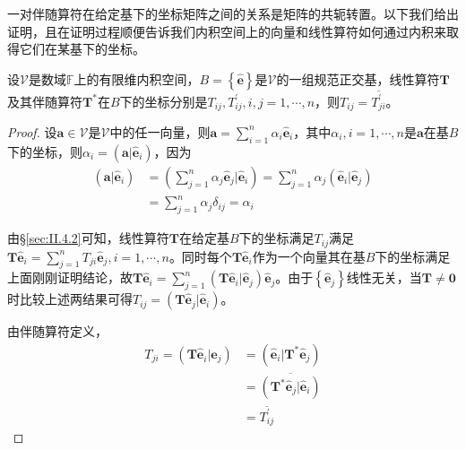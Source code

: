 \documentclass[main.tex]{subfiles}
\begin{document}
一对伴随算符在给定基下的坐标矩阵之间的关系是矩阵的共轭转置。以下我们给出证明，且在证明过程顺便告诉我们内积空间上的向量和线性算符如何通过内积来取得它们在某基下的坐标。

\begin{theorem}
设$\mathcal{V}$是数域$\mathbb{F}$上的有限维内积空间，$B=\left\{\mathbf{\hat{e}}\right\}$是$\mathcal{V}$的一组规范正交基，线性算符$\mathbf{T}$及其伴随算符$\mathbf{T}^*$在$B$下的坐标分别是$T_{ij},T^\prime_{ij},i,j=1,\cdots,n$，则$T_{ij}=\overline{T^\prime_{ji}}$。
\end{theorem}
\begin{proof}
设$\mathbf{a}\in\mathcal{V}$是$\mathcal{V}$中的任一向量，则$\mathbf{a}=\sum_{i=1}^n\alpha_i\mathbf{\hat{e}}_i$，其中$\alpha_i,i=1,\cdots,n$是$\mathbf{a}$在基$B$下的坐标，则$\alpha_i=\left(\mathbf{a}|\mathbf{\hat{e}}_i\right)$，因为
\begin{align*}
\left(\mathbf{a}|\mathbf{\hat{e}}_i\right)&=\left(\sum_{j=1}^n\alpha_j\mathbf{\hat{e}}_j|\mathbf{\hat{e}}_i\right)=\sum_{j=1}^n\alpha_j\left(\mathbf{\hat{e}}_i|\mathbf{\hat{e}}_j\right)
\\&=\sum_{j=1}^n\alpha_j\delta_{ij}=\alpha_i
\end{align*}

由\S\ref{sec:II.4.2}可知，线性算符$\mathbf{T}$在给定基$B$下的坐标满足$T_{ij}$满足$\mathbf{T\hat{e}}_i=\sum_{j=1}^nT_{ji}\mathbf{\hat{e}}_j,i=1,\cdots,n$。同时每个$\mathbf{T\hat{e}}_i$作为一个向量其在基$B$下的坐标满足上面刚刚证明结论，故$\mathbf{T\hat{e}}_i=\sum_{j=1}^n\left(\mathbf{T\hat{e}}_i|\mathbf{\hat{e}}_j\right)\mathbf{\hat{e}}_j$。由于$\left\{\mathbf{\hat{e}}_j\right\}$线性无关，当$\mathbf{T}\neq\mathbf{0}$时比较上述两结果可得$T_{ij}=\left(\mathbf{T\hat{e}}_j|\mathbf{\hat{e}}_i\right)$。

由伴随算符定义，
\begin{align*}
    T_{ji}=\left(\mathbf{T\hat{e}}_i|\mathbf{\hat{e}}_j\right)&=\left(\mathbf{\hat{e}}_i|\mathbf{T}^*\mathbf{\hat{e}}_j\right)\\
    &=\overline{\left(\mathbf{T}^*\mathbf{\hat{e}}_j|\mathbf{\hat{e}}_i\right)}\\
    &=\overline{T^\prime_{ij}}
\end{align*}
\end{proof}
\end{document}
